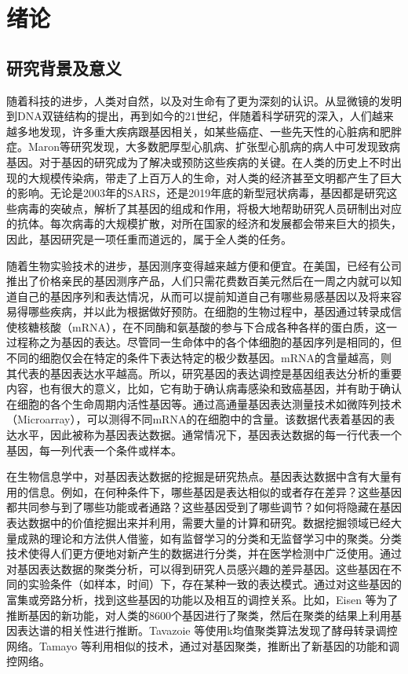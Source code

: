 \chapter{绪论}

\section{研究背景及意义}
    随着科技的进步，人类对自然，以及对生命有了更为深刻的认识。从显微镜的发明到DNA双链结构的提出，再到如今的21世纪，伴随着科学研究的深入，人们越来越多地发现，许多重大疾病跟基因相关，如某些癌症、一些先天性的心脏病和肥胖症。Maron等研究发现，大多数肥厚型心肌病、扩张型心肌病的病人中可发现致病基因。对于基因的研究成为了解决或预防这些疾病的关键。在人类的历史上不时出现的大规模传染病，带走了上百万人的生命，对人类的经济甚至文明都产生了巨大的影响。无论是2003年的SARS，还是2019年底的新型冠状病毒，基因都是研究这些病毒的突破点，解析了其基因的组成和作用，将极大地帮助研究人员研制出对应的抗体。每次病毒的大规模扩散，对所在国家的经济和发展都会带来巨大的损失，因此，基因研究是一项任重而道远的，属于全人类的任务。

    随着生物实验技术的进步，基因测序变得越来越方便和便宜。在美国，已经有公司推出了价格亲民的基因测序产品，人们只需花费数百美元然后在一周之内就可以知道自己的基因序列和表达情况，从而可以提前知道自己有哪些易感基因以及将来容易得哪些疾病，并以此为根据做好预防。在细胞的生物过程中，基因通过转录成信使核糖核酸（mRNA），在不同酶和氨基酸的参与下合成各种各样的蛋白质，这一过程称之为基因的表达。尽管同一生命体中的各个体细胞的基因序列是相同的，但不同的细胞仅会在特定的条件下表达特定的极少数基因。mRNA的含量越高，则其代表的基因表达水平越高。所以，研究基因的表达调控是基因组表达分析的重要内容，也有很大的意义，比如，它有助于确认病毒感染和致癌基因，并有助于确认在细胞的各个生命周期内活性基因等。通过高通量基因表达测量技术如微阵列技术（Microarray），可以测得不同mRNA的在细胞中的含量。该数据代表着基因的表达水平，因此被称为基因表达数据。通常情况下，基因表达数据的每一行代表一个基因，每一列代表一个条件或样本。

    在生物信息学中，对基因表达数据的挖掘是研究热点。基因表达数据中含有大量有用的信息。例如，在何种条件下，哪些基因是表达相似的或者存在差异？这些基因都共同参与到了哪些功能或者通路？这些基因受到了哪些调节？如何将隐藏在基因表达数据中的价值挖掘出来并利用，需要大量的计算和研究。数据挖掘领域已经大量成熟的理论和方法供人借鉴，如有监督学习的分类和无监督学习中的聚类。分类技术使得人们更方便地对新产生的数据进行分类，并在医学检测中广泛使用。通过对基因表达数据的聚类分析，可以得到研究人员感兴趣的差异基因。这些基因在不同的实验条件（如样本，时间）下，存在某种一致的表达模式。通过对这些基因的富集或旁路分析，找到这些基因的功能以及相互的调控关系。比如，Eisen 等为了推断基因的新功能，对人类的8600个基因进行了聚类，然后在聚类的结果上利用基因表达谱的相关性进行推断。Tavazoie 等使用k均值聚类算法发现了酵母转录调控网络。Tamayo 等利用相似的技术，通过对基因聚类，推断出了新基因的功能和调控网络。 

